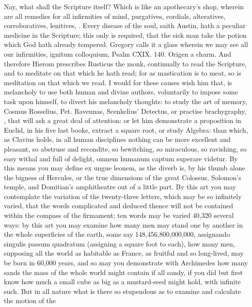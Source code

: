 {Nay, what shall the Scripture itself? Which is like an apothecary's
shop, wherein are all remedies for all infirmities of mind, purgatives,
cordials, alteratives, corroboratives, lenitives, \etc{}. Every disease of
the soul, saith Austin, hath a peculiar medicine in the
Scripture; this only is required, that the sick man take the potion
which God hath already tempered. Gregory calls it a glass wherein
we may see all our infirmities, ignitum colloquium, Psalm CXIX. 140.
Origen a charm. And therefore Hierom prescribes Rusticus the
monk, continually to read the Scripture, and to meditate on that
which he hath read; for as mastication is to meat, so is meditation on
that which we read. I would for these causes wish him that, is
melancholy to use both human and divine authors, voluntarily to impose
some task upon himself, to divert his melancholy thoughts: to study the
art of memory, Cosmus Rosselius, Pet. Ravennas, Scenkelius' Detectus,
or practise brachygraphy, \etc{}, that will ask a great deal of attention:
or let him demonstrate a proposition in Euclid, in his five last books,
extract a square root, or study Algebra: than which, as Clavius
holds, in all human disciplines nothing can be more excellent and
pleasant, so abstruse and recondite, so bewitching, so miraculous, so
ravishing, so easy withal and full of delight, omnem humanum captum
superare videtur. By this means you may define ex ungue leonem, as the
diverb is, by his thumb alone the bigness of Hercules, or the true
dimensions of the great Colossus, Solomon's temple, and
Domitian's amphitheatre out of a little part. By this art you may
contemplate the variation of the twenty-three letters, which may be so
infinitely varied, that the words complicated and deduced thence will
not be contained within the compass of the firmament; ten words may be
varied 40,320 several ways: by this art you may examine how many men
may stand one by another in the whole superficies of the earth, some
say 148,456,800,000,000, assignando singulis passum quadratum
(assigning a square foot to each), how many men, supposing all the
world as habitable as France, as fruitful and so long-lived, may be
born in 60,000 years, and so may you demonstrate with Archimedes
how many sands the mass of the whole world might contain if all sandy,
if you did but first know how much a small cube as big as a
mustard-seed might hold, with infinite such. But in all nature what is
there so stupendous as to examine and calculate the motion of the
}
